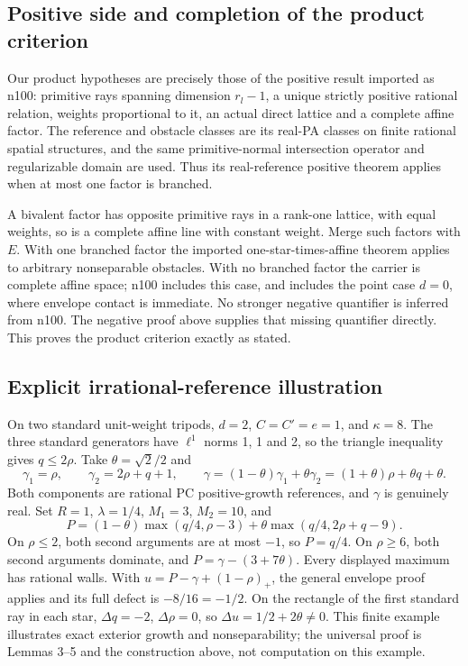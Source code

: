 \documentclass[
  11pt,
]{article}
\begin{document}
\subsection{Positive side and completion of the product
criterion}\label{positive-side-and-completion-of-the-product-criterion}

Our product hypotheses are precisely those of the positive result
imported as n100: primitive rays spanning dimension \(r_l-1\), a unique
strictly positive rational relation, weights proportional to it, an
actual direct lattice and a complete affine factor. The reference and
obstacle classes are its real-PA classes on finite rational spatial
structures, and the same primitive-normal intersection operator and
regularizable domain are used. Thus its real-reference positive theorem
applies when at most one factor is branched.

A bivalent factor has opposite primitive rays in a rank-one lattice,
with equal weights, so is a complete affine line with constant weight.
Merge such factors with \(E\). With one branched factor the imported
one-star-times-affine theorem applies to arbitrary nonseparable
obstacles. With no branched factor the carrier is complete affine space;
n100 includes this case, and includes the point case \(d=0\), where
envelope contact is immediate. No stronger negative quantifier is
inferred from n100. The negative proof above supplies that missing
quantifier directly. This proves the product criterion exactly as
stated.

\subsection{Explicit irrational-reference
illustration}\label{explicit-irrational-reference-illustration}

On two standard unit-weight tripods, \(d=2\), \(C=C'=e=1\), and
\(\kappa=8\). The three standard generators have \(\ell^1\) norms 1, 1
and 2, so the triangle inequality gives \(q\leq2\rho\). Take
\(\theta=\sqrt2/2\) and \[
\gamma_1=\rho,\qquad \gamma_2=2\rho+q+1,\qquad
\gamma=(1-\theta)\gamma_1+\theta\gamma_2
=(1+\theta)\rho+\theta q+\theta.
\] Both components are rational PC positive-growth references, and
\(\gamma\) is genuinely real. Set \(R=1\), \(\lambda=1/4\), \(M_1=3\),
\(M_2=10\), and \[
P=(1-\theta)\max(q/4,\rho-3)
+\theta\max(q/4,2\rho+q-9).
\] On \(\rho\leq2\), both second arguments are at most \(-1\), so
\(P=q/4\). On \(\rho\geq6\), both second arguments dominate, and
\(P=\gamma-(3+7\theta)\). Every displayed maximum has rational walls.
With \(u=P-\gamma+(1-\rho)_+\), the general envelope proof applies and
its full defect is \(-8/16=-1/2\). On the rectangle of the first
standard ray in each star, \(\Delta q=-2\), \(\Delta\rho=0\), so
\(\Delta u=1/2+2\theta\ne0\). This finite example illustrates exact
exterior growth and nonseparability; the universal proof is Lemmas 3--5
and the construction above, not computation on this example.
\end{document}
